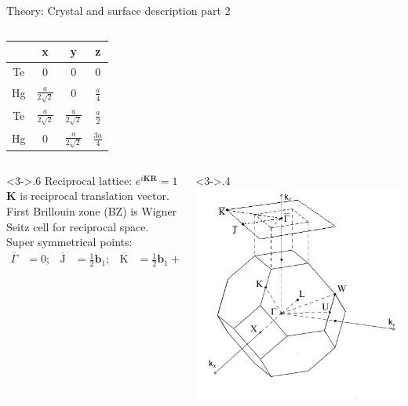 \begin{frame}{Theory: Crystal and surface description part 2}
\begin{columns}
\begin{column}
{\begin{tabular}{c c c c}
				\hline
				& \textbf{x} & \textbf{y} & \textbf{z}\\ 
				\hline
				\vspace{0.2cm} 
				Te & 0 & 0 & 0 \\
				\vspace{0.2cm}
				Hg & $\frac{a}{2\sqrt{2}}$ & 0 & $\frac{a}{4}$ \\
				\vspace{0.2cm}
				Te & $\frac{a}{2\sqrt{2}}$ & $\frac{a}{2\sqrt{2}}$ & $\frac{a}{2}$ \\
				\vspace{0.2cm}
				Hg & 0 & $\frac{a}{2\sqrt{2}}$ & $\frac{3a}{4}$
			\end{tabular}
		}
		\end{column}
	\end{columns}
	\begin{columns}
		\begin{column}<3->{.6\linewidth}
			Reciprocal lattice: $e^{i\boldsymbol{K}\boldsymbol{R}} = 1$\\
			$\boldsymbol{K}$ is reciprocal translation vector.\\
			First Brillouin zone (BZ) is Wigner Seitz cell for reciprocal space.\\
			Super symmetrical points:\vspace{-.3cm}
			\begin{align*}
			\overline{\Gamma}&= 0;&
			\overline{\text{J}} &= \frac{1}{2} \boldsymbol{b}_1 ;&
			\overline{\text{K}}&= \frac{1}{2} \boldsymbol{b}_1 + \frac{1}{2} \boldsymbol{b}_2 
			\end{align*}
		\end{column}
		\begin{column}<3->{.4\linewidth}
			\includegraphics[width=\linewidth]{andere_bilder/brillouin_zone_001_2}

\end{column}
\end{columns}
\end{frame}
